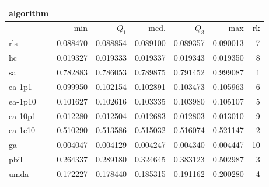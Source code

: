 \begin{tabular}{@{}l*{5}{>{{}}N{1}{3}}>{{}}N{2}{0}@{}}
\toprule
{algorithm} &  \\
\midrule
& {min} & {$Q_1$} & {med.} & {$Q_3$} & {max} & {rk}\\
\midrule
rls & 0.088470 & 0.088854 & 0.089100 & 0.089357 & 0.090013 & 7\\
hc & 0.019327 & 0.019333 & 0.019337 & 0.019343 & 0.019350 & 8\\
sa & {\color{blue}} 0.782883 & {\color{blue}} 0.786053 & {\color{blue}} 0.789875 & {\color{blue}} 0.791452 & {\color{blue}} 0.999087 & 1\\
ea-1p1 & 0.099950 & 0.102154 & 0.102891 & 0.103473 & 0.105963 & 6\\
ea-1p10 & 0.101627 & 0.102616 & 0.103335 & 0.103980 & 0.105107 & 5\\
ea-10p1 & 0.012280 & 0.012504 & 0.012683 & 0.012803 & 0.013010 & 9\\
ea-1c10 & 0.510290 & 0.513586 & 0.515032 & 0.516074 & 0.521147 & 2\\
ga & 0.004047 & 0.004129 & 0.004247 & 0.004340 & 0.004447 & 10\\
pbil & 0.264337 & 0.289180 & 0.324645 & 0.383123 & 0.502987 & 3\\
umda & 0.172227 & 0.178440 & 0.185315 & 0.191162 & 0.200280 & 4\\
\bottomrule
\end{tabular}
